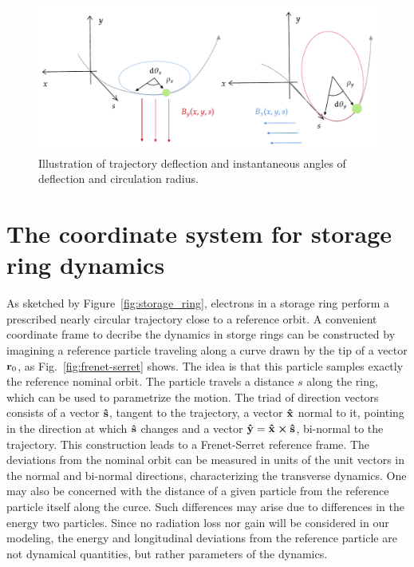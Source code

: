 \begin{figure}[htb]
    \centering
    \includegraphics[width=\textwidth]{Images/deflections.pdf}
    \caption{Illustration of trajectory deflection and instantaneous angles of deflection and circulation radius.}
    \label{fig:deflec_angles}
\end{figure}
\section{The coordinate system for storage ring dynamics}
As sketched by Figure~\ref{fig:storage_ring}, electrons in a storage ring perform a prescribed nearly circular trajectory close to a reference orbit. A convenient coordinate frame to decribe the dynamics in storge rings can be constructed by imagining a reference particle traveling along a curve drawn by the tip of a vector $\vb{r}_0$, as Fig.~\ref{fig:frenet-serret} shows. The idea is that this particle samples exactly the reference nominal orbit. The particle travels a distance $s$ along the ring, which can be used to parametrize the motion. The triad of direction vectors consists of a vector $\vu{s}$, tangent to the trajectory, a vector $\vu{x}$ normal to it, pointing in the direction at which $\vu{s}$ changes and a vector $\vu{y}=\vu{x}\cross\vu{s}$, bi-normal to the trajectory. This construction leads to a Frenet-Serret reference frame. The deviations from the nominal orbit can be measured in units of the unit vectors in the normal and bi-normal directions, characterizing the transverse dynamics. One may also be concerned with the distance of a given particle from the reference particle itself along the curce. Such differences may arise due to differences in the energy two particles. Since no radiation loss nor gain will be considered in our modeling, the energy and longitudinal deviations from the reference particle are not dynamical quantities, but rather parameters of the dynamics.


